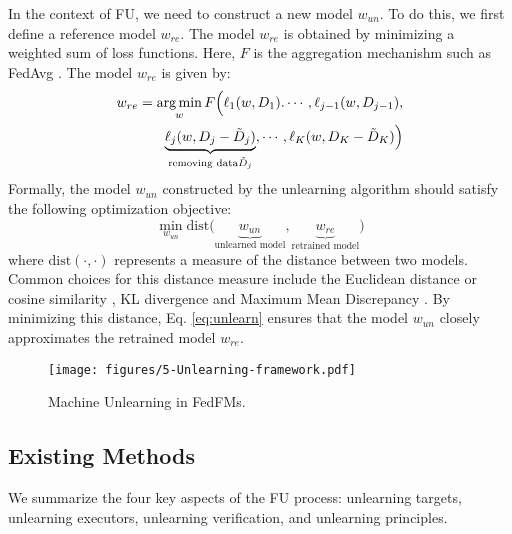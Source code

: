 In the context of FU, we need to construct a new model $w_{un}$. To do this, we first define a reference model $w_{re}$. The model $w_{re}$ is obtained by minimizing a weighted sum of loss functions. Here, $F$ is the aggregation mechanishm such as FedAvg \cite{mcmahan2017communication} . The model $w_{re}$ is given by:
\begin{equation}
\begin{split}
 w_{re}=\operatorname*{arg\,min}_w F \Big (\ell_1(w, D_1). \cdots, \ell_{j-1}(w, D_{j-1}), \\
\underbrace{\ell_j(w, D_j - \tilde{D}_{j})}_{\text{removing data}\tilde{D}_{j}}, \cdots, \ell_K(w, D_K - \tilde{D}_{K})\Big)   
\end{split}
\end{equation}
Formally, the model $w_{un}$ constructed by the unlearning algorithm should satisfy the following optimization objective:
\begin{equation}\label{eq:unlearn}
\min_{w_{un}}\text{dist}\Big(\underbrace{w_{un}}_{\text{unlearned model}}, \underbrace{w_{re}}_{\text{retrained model}}\Big)
\end{equation}
where $\text{dist}(\cdot,\cdot)$ represents a measure of the distance between two models. Common choices for this distance measure include the Euclidean distance or cosine similarity \cite{gu2024ferrari}, KL divergence \cite{van2014renyi} and Maximum Mean Discrepancy \cite{pan2008transfer}. By minimizing this distance, Eq. \eqref{eq:unlearn} ensures that the model $w_{un}$ closely approximates the retrained model $w_{re}$.
\begin{figure}[ht]
    \centering
     \texttt{[image: figures/5-Unlearning-framework.pdf]}
     \caption{Machine Unlearning in FedFMs.}%
     \label{fig: 5-Unlearning-framework.pdf}
     \vspace{-5mm}
 \end{figure}



\subsection{Existing Methods}
We summarize the four key aspects of the FU process: unlearning targets, unlearning executors, unlearning verification, and unlearning principles.


